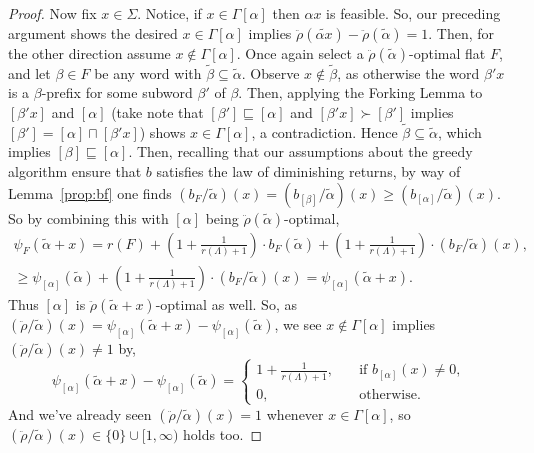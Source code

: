 \documentclass[11pt]{article}
\newcommand{\univ}{\Sigma}
\newcommand{\glang}{\Lambda}
\newcommand{\greedyrep}{\ddot{\rho}}
\begin{document}
\begin{proof}
    Now fix $x \in \univ$.
    Notice, if $x \in\Gamma[\alpha]$ then $\alpha x$ is feasible.
    So, our preceding argument shows the desired $x \in\Gamma[\alpha]$ implies $\greedyrep(\widetilde{\alpha x}) - \greedyrep(\widetilde{\alpha}) = 1$.
    Then, for the other direction assume $x \notin\Gamma[\alpha]$.
    Once again select a $\greedyrep(\widetilde{\alpha})$-optimal flat $F$, and let $\beta\in F$ be any word with $\widetilde{\beta}\subseteq\widetilde{\alpha}$.
    Observe $x\notin\widetilde{\beta}$, as otherwise the word $\beta'x$ is a $\beta$-prefix for some subword $\beta'$ of $\beta$.
    Then, applying the Forking Lemma to $[\beta' x]$ and $[\alpha]$ (take note that $[\beta']\sqsubseteq [\alpha]$ and $[\beta'x]\succ[\beta']$ implies $[\beta']=[\alpha]\sqcap[\beta'x]$) shows $x\in \Gamma[\alpha]$, a contradiction.
    Hence $\widetilde{\beta}\subseteq\widetilde{\alpha}$, which implies $[\beta]\sqsubseteq [\alpha]$.
    Then, recalling that our assumptions about the greedy algorithm ensure that $b$ satisfies the law of diminishing returns, by way of Lemma~\ref{prop:bf} one finds $\left(b_{F}/\widetilde{\alpha}\right)(x)=\left(b_{[\beta]}/\widetilde{\alpha}\right)(x) \geq \left(b_{[\alpha]}/\widetilde{\alpha}\right)(x)$.
    So by combining this with $[\alpha]$ being $\greedyrep(\widetilde{\alpha})$-optimal,
    \begin{multline*}
        \psi_{F}(\widetilde{\alpha}+ x) = r(F) + \left(1 + \frac{1}{r(\glang) + 1}\right)\cdot b_F(\widetilde{\alpha}) +\left(1 + \frac{1}{r(\glang) + 1}\right)\cdot \left(b_{F}/\widetilde{\alpha}\right)(x),\\\geq \psi_{[\alpha]}(\widetilde{\alpha}) + \left(1 + \frac{1}{r(\glang) + 1}\right)\cdot \left(b_{F}/\widetilde{\alpha}\right)(x) = \psi_{[\alpha]}(\widetilde{\alpha}+x).
    \end{multline*}
    Thus $[\alpha]$ is $\greedyrep(\widetilde{\alpha}+x)$-optimal as well.
    So, as $\left(\greedyrep/\widetilde{\alpha}\right)(x) = \psi_{[\alpha]}(\widetilde{\alpha}+x) - \psi_{[\alpha]}(\widetilde{\alpha})$, we see $x\notin\Gamma[\alpha]$ implies $\left(\greedyrep/\widetilde{\alpha}\right)(x) \neq 1$ by,
    \begin{equation*}
        \psi_{[\alpha]}(\widetilde{\alpha}+x) - \psi_{[\alpha]}(\widetilde{\alpha}) = \begin{cases}
            1 + \frac{1}{r(\glang) + 1},\quad&\text{if }b_{[\alpha]}(x) \neq 0,\\
            0,&\text{otherwise}.
        \end{cases}
    \end{equation*}
    And we've already seen $\left(\greedyrep/\widetilde{\alpha}\right)(x) = 1$ whenever $x \in\Gamma[\alpha]$, so $\left(\greedyrep/\widetilde{\alpha}\right)(x) \in \{0\}\cup[1,\infty)$ holds too.
\end{proof}
\end{document}
